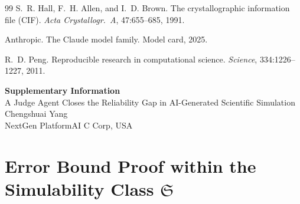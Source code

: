 \documentclass[11pt,a4paper]{article}
\renewcommand{\headrulewidth}{0pt}
\newcommand{\Sclass}{\mathfrak{S}}
\begin{document}
\begin{thebibliography}{99}
S.~R. Hall, F.~H. Allen, and I.~D. Brown. The crystallographic information file ({CIF}). \emph{Acta Crystallogr.\ A}, 47:655--685, 1991.



Anthropic. The {Claude} model family. Model card, 2025.


R.~D. Peng. Reproducible research in computational science. \emph{Science}, 334:1226--1227, 2011.

\end{thebibliography}



\clearpage

\setcounter{section}{0}
\renewcommand{\thesection}{S\arabic{section}}
\renewcommand{\thesubsection}{S\arabic{section}.\arabic{subsection}}
\captionsetup[table]{labelformat=empty}
\captionsetup[figure]{labelformat=empty}
\renewcommand{\theequation}{S\arabic{equation}}
\setcounter{equation}{0}

\renewcommand{\headrulewidth}{0.4pt}

\begin{center}
{\Large\bfseries Supplementary Information}\\[12pt]
{\large A Judge Agent Closes the Reliability Gap in AI-Generated Scientific Simulation}\\[8pt]
{\normalsize Chengshuai Yang}\\[4pt]
{\small NextGen PlatformAI C Corp, USA}
\end{center}

\vspace{12pt}
\renewcommand{\contentsname}{Supplementary Contents}
\tableofcontents
\newpage


\section{Error Bound Proof within the Simulability Class $\Sclass$}
\label{sec:s1}
\end{document}
